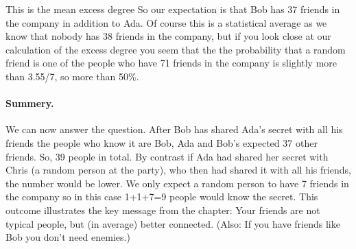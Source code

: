 This is the mean excess degree 
So our expectation is that Bob has 37 friends in the company in addition to Ada. Of course this is a statistical average as we know that nobody has 38 friends in the company, but if you look close at our calculation of the excess degree you seem that the the probability that a random friend is one of the people who have 71 friends in the company is slightly more than 3.55/7, so more than 50\%. 

\paragraph{Summery.} We can now answer the question. After Bob has shared Ada's secret with all his friends the people who know it are Bob, Ada and Bob's expected 37 other friends. So, 39 people in total. By contrast if Ada had shared her secret with Chris (a random person at the party), who then had shared it with all his friends, the number would be lower. We only expect a random person to have 7 friends in the company so in this case 1+1+7=9 people would know the secret. This outcome illustrates the key message from the chapter: Your friends are not typical people, but (in average) better connected. (Also: If you have friends like Bob you don't need enemies.)